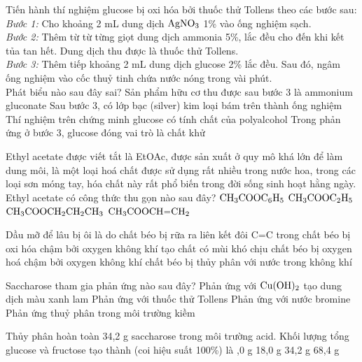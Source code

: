 \documentclass[11pt,a4paper]{article}
\begin{document}
\begin{ex}
Tiến hành thí nghiệm glucose bị oxi hóa bởi thuốc thử Tollens theo các bước sau:\\
\textit{Bước 1:} Cho khoảng 2 mL dung dịch $\ce{AgNO3}$ 1\% vào ống nghiệm sạch.\\
\textit{Bước 2:} Thêm từ từ từng giọt dung dịch ammonia 5\%, lắc đều cho đến khi kết tủa tan hết. Dung dịch thu được là thuốc thử Tollens.\\
\textit{Bước 3:} Thêm tiếp khoảng 2 mL dung dịch glucose 2\% lắc đều. Sau đó, ngâm ống nghiệm vào cốc thuỷ tinh chứa nước nóng trong vài phút.\\
Phát biểu nào sau đây sai?
\choice
{Sản phẩm hữu cơ thu được sau bước 3 là ammonium gluconate}
{Sau bước 3, có lớp bạc (silver) kim loại bám trên thành ống nghiệm}
{\True Thí nghiệm trên chứng minh glucose có tính chất của polyalcohol}
{Trong phản ứng ở bước 3, glucose đóng vai trò là chất khử}

\end{ex}

\begin{ex}
Ethyl acetate được viết tắt là EtOAc, được sản xuất ở quy mô khá lớn để làm dung môi, là một loại hoá chất được sử dụng rất nhiều trong nước hoa, trong các loại sơn móng tay, hóa chất này rất phổ biến trong đời sống sinh hoạt hằng ngày. Ethyl acetate có công thức thu gọn nào sau đây?
\choice
{$\ce{CH3COOC6H5}$}
{\True $\ce{CH3COOC2H5}$}
{$\ce{CH3COOCH2CH2CH3}$}
{$\ce{CH3COOCH=CH2}$}

\end{ex}

\begin{ex}
Dầu mỡ để lâu bị ôi là do
\choice
{chất béo bị rữa ra}
{\True liên kết đôi C=C trong chất béo bị oxi hóa chậm bởi oxygen không khí tạo chất có mùi khó chịu}
{chất béo bị oxygen hoá chậm bởi oxygen không khí}
{chất béo bị thủy phân với nước trong không khí}

\end{ex}

\begin{ex}
Saccharose tham gia phản ứng nào sau đây?
\choice
{\True Phản ứng với $\ce{Cu(OH)2}$ tạo dung dịch màu xanh lam}
{Phản ứng với thuốc thử Tollens}
{Phản ứng với nước bromine}
{Phản ứng thuỷ phân trong môi trường kiềm}

\end{ex}

\begin{ex}
Thủy phân hoàn toàn 34,2 g saccharose trong môi trường acid. Khối lượng tổng glucose và fructose tạo thành (coi hiệu suất 100\%) là
\choice
{,0 g}
{18,0 g}
{34,2 g}
{68,4 g}

\end{ex}
\end{document}
